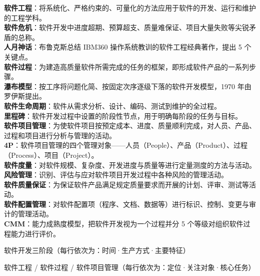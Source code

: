 \documentclass[a4paper,11pt]{article}
\begin{document}
\begin{keyterms}
\textbf{软件工程}：将系统化、严格约束的、可量化的方法应用于软件的开发、运行和维护的工程学科。\\
\textbf{软件危机}：软件开发中进度超期、预算超支、质量难保证、项目大量失败等尖锐矛盾的总称。\\
\textbf{人月神话}：布鲁克斯总结 IBM360 操作系统教训的软件工程经典著作，提出 5 个关键点。\\
\textbf{软件过程}：为建造高质量软件所需完成的任务的框架，即形成软件产品的一系列步骤。\\
\textbf{瀑布模型}：按工序将问题化简、按固定次序逐级下落的软件开发模型，1970 年由罗伊斯提出。\\
\textbf{软件生命周期}：软件从需求分析、设计、编码、测试到维护的全过程。\\
\textbf{里程碑}：软件开发过程中设置的阶段性节点，用于明确每阶段的任务与目标。\\
\textbf{软件项目管理}：为使软件项目按预定成本、进度、质量顺利完成，对人员、产品、过程和项目进行分析与管理的活动。\\
\textbf{4P}：软件项目管理的四个管理对象——人员（People）、产品（Product）、过程（Process）、项目（Project）。\\
\textbf{软件度量}：对软件规模、复杂度、开发进度与质量等进行定量测度的方法与活动。\\
\textbf{风险管理}：识别、评估与应对软件项目开发过程中各种风险的管理活动。\\
\textbf{软件质量保证}：为保证软件产品满足规定质量要求而开展的计划、评审、测试等活动。\\
\textbf{软件配置管理}：对软件配置项（程序、文档、数据等）进行标识、控制、变更与审计的管理活动。\\
\textbf{CMM}：能力成熟度模型，把软件开发视为一个过程并分 5 个等级对组织软件过程能力进行评价。
\end{keyterms}

\newpage
\begin{contrast}{软件开发三阶段（每行依次为：时间·生产方式·主要特征）}
\end{contrast}

\begin{contrast}{软件工程 / 软件过程 / 软件项目管理（每行依次为：定位·关注对象·核心任务）}
\end{contrast}
\end{document}
